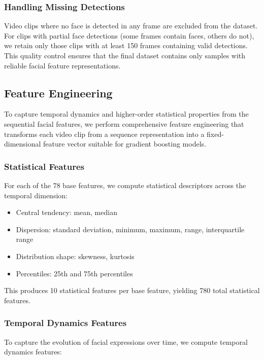 \documentclass[11pt,a4paper]{article}
\begin{document}
\subsubsection{Handling Missing Detections}

Video clips where no face is detected in any frame are excluded from the dataset. For clips with partial face detections (some frames contain faces, others do not), we retain only those clips with at least 150 frames containing valid detections. This quality control ensures that the final dataset contains only samples with reliable facial feature representations.

\subsection{Feature Engineering}

To capture temporal dynamics and higher-order statistical properties from the sequential facial features, we perform comprehensive feature engineering that transforms each video clip from a sequence representation into a fixed-dimensional feature vector suitable for gradient boosting models.

\subsubsection{Statistical Features}

For each of the 78 base features, we compute statistical descriptors across the temporal dimension:

\begin{itemize}
    \item Central tendency: mean, median
    \item Dispersion: standard deviation, minimum, maximum, range, interquartile range
    \item Distribution shape: skewness, kurtosis
    \item Percentiles: 25th and 75th percentiles
\end{itemize}

This produces 10 statistical features per base feature, yielding 780 total statistical features.

\subsubsection{Temporal Dynamics Features}

To capture the evolution of facial expressions over time, we compute temporal dynamics features:
\end{document}
